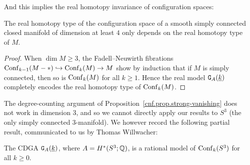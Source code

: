 And this implies the real homotopy invariance of configuration spaces:

\begin{corollary}
  \label{cnf.cor.only-depends}
  The real homotopy type of the configuration space of a smooth simply connected closed manifold of dimension at least $4$ only depends on the real homotopy type of $M$.
\end{corollary}

\begin{proof}
  When $\dim M \geq 3$, the Fadell--Neuwirth fibrations~\cite{FadellNeuwirth1962} $\operatorname{Conf}_{k-1}(M - *) \hookrightarrow \operatorname{Conf}_{k}(M) \to M$ show by induction that if $M$ is simply connected, then so is $\operatorname{Conf}_{k}(M)$ for all $k \geq 1$.
  Hence the real model $\mathtt{G}_{A}(\underline{k})$ completely encodes the real homotopy type of $\operatorname{Conf}_{k}(M)$.
\end{proof}

The degree-counting argument of Proposition~\ref{cnf.prop.strong-vanishing} does not work in dimension $3$, and so we cannot directly apply our results to $S^{3}$ (the only simply connected $3$-manifold).
We however record the following partial result, communicated to us by Thomas Willwacher:

\begin{proposition}
  \label{cnf.prop.result-s3}
  The CDGA $\mathtt{G}_{A}(\underline{k})$, where $A = H^{*}(S^{3}; \mathbb{Q})$, is a rational model of $\operatorname{Conf}_{k}(S^{3})$ for all $k \ge 0$.
\end{proposition}

